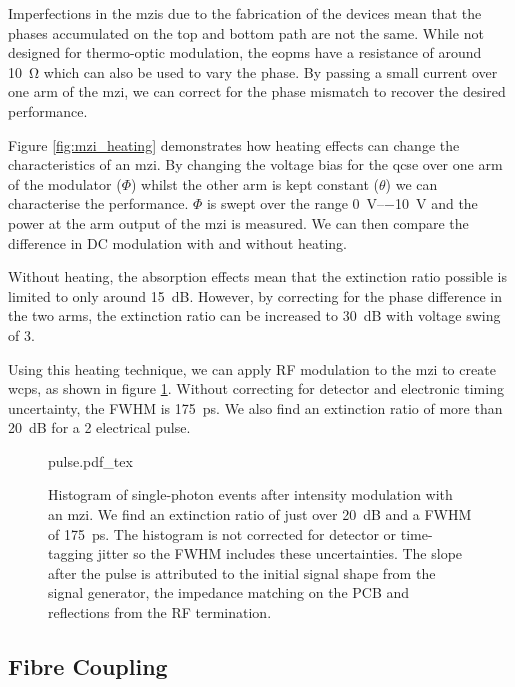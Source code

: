 Imperfections in the \acp{mzi} due to the fabrication of the devices mean that the phases accumulated on the top and bottom path are not the same. While not designed for thermo-optic modulation, the \acp{eopm} have a resistance of around \SI{10}{\ohm} which can also be used to vary the phase. By passing a small current over one arm of the \ac{mzi}, we can correct for the phase mismatch to recover the desired performance.

Figure \ref{fig:mzi_heating} demonstrates how heating effects can change the characteristics of an \ac{mzi}. By changing the voltage bias for the \ac{qcse} over one arm of the modulator ($\Phi$) whilst the other arm is kept constant ($\theta$) we can characterise the performance. $\Phi$ is swept over the range \SIrange{0}{-10}{V} and the power at the arm output of the \ac{mzi} is measured. We can then compare the difference in DC modulation with and without heating. 

Without heating, the absorption effects mean that the extinction ratio possible is limited to only around \SI{15}{dB}. However, by correcting for the phase difference in the two arms, the extinction ratio can be increased to \SI{30}{dB} with voltage swing of \SI{3}{\Vpp}. 

Using this heating technique, we can apply RF modulation to the \ac{mzi} to create \acp{wcp}, as shown in figure \ref{fig:pulses}. Without correcting for detector and electronic timing uncertainty, the \ac{FWHM} is \SI{175}{ps}. We also find an extinction ratio of more than \SI{20}{dB} for a \SI{2}{\Vpp} electrical pulse.

\begin{figure}[tp]
	\centering
	\small
	\def\svgwidth{0.8\textwidth} 
	{pulse.pdf_tex}
	\caption[On-chip intensity modulation of coherent states]{Histogram of single-photon events after intensity modulation with an \ac{mzi}. We find an extinction ratio of just over \SI{20}{dB} and a \ac{FWHM} of \SI{175}{\ps}. The histogram is not corrected for detector or time-tagging jitter so the \ac{FWHM} includes these uncertainties. The slope after the pulse is attributed to the initial signal shape from the signal generator, the impedance matching on the PCB and reflections from the RF termination.}
	\label{fig:pulses}
\end{figure}

\subsection{Fibre Coupling}

